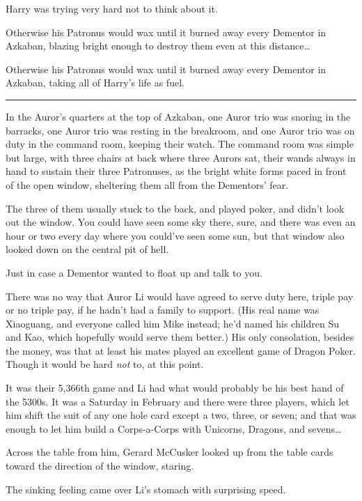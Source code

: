 Harry was trying very hard not to think about it.

Otherwise his Patronus would wax until it burned away every Dementor in
Azkaban, blazing bright enough to destroy them even at this
distance\ldots{}

Otherwise his Patronus would wax until it burned away every Dementor in
Azkaban, taking all of Harry's life as fuel.

\begin{center}\rule{3in}{0.4pt}\end{center}

In the Auror's quarters at the top of Azkaban, one Auror trio was
snoring in the barracks, one Auror trio was resting in the breakroom,
and one Auror trio was on duty in the command room, keeping their watch.
The command room was simple but large, with three chairs at back where
three Aurors sat, their wands always in hand to sustain their three
Patronuses, as the bright white forms paced in front of the open window,
sheltering them all from the Dementors' fear.

The three of them usually stuck to the back, and played poker, and
didn't look out the window. You could have seen some sky there, sure,
and there was even an hour or two every day where you could've seen some
sun, but that window also looked down on the central pit of hell.

Just in case a Dementor wanted to float up and talk to you.

There was no way that Auror Li would have agreed to serve duty here,
triple pay or no triple pay, if he hadn't had a family to support. (His
real name was Xiaoguang, and everyone called him Mike instead; he'd
named his children Su and Kao, which hopefully would serve them better.)
His only consolation, besides the money, was that at least his mates
played an excellent game of Dragon Poker. Though it would be hard
\emph{not} to, at this point.

It was their 5,366th game and Li had what would probably be his best
hand of the 5300s. It was a Saturday in February and there were three
players, which let him shift the suit of any one hole card except a two,
three, or seven; and that was enough to let him build a Corps-a-Corps
with Unicorns, Dragons, and sevens\ldots{}

Across the table from him, Gerard McCusker looked up from the table
cards toward the direction of the window, staring.

The sinking feeling came over Li's stomach with surprising speed.

